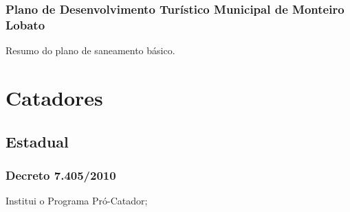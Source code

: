 \begin{subapend}
\begin{subsubapend}
		\subsubsection{Plano de Desenvolvimento Turístico Municipal de Monteiro Lobato}
		Resumo do plano de saneamento básico.
	\end{subsubapend}
\end{subapend}

\section{Catadores}


\begin{subapend}
	\subsection{Estadual}
	\begin{subsubapend}
		\item \subsubsection{Decreto 7.405/2010}
		Institui o Programa Pró-Catador;
	\end{subsubapend}
\end{subapend}

